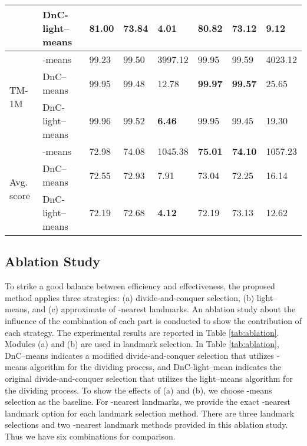 \begin{table*}[]
\begin{tabular}{@{}llllllll@{}}
                                & DnC-light--means & {81.00}        & {73.84}          & \multicolumn{1}{l|}{{\textbf{4.01}}} & {80.82}          & {73.12}          & {9.12}    \\
    \midrule
    \multirow{3}{*}{TM-1M}      & -means           & {99.23}        & {99.50}          & \multicolumn{1}{l|}{{3997.12}}       & 99.95            & 99.59            & 4023.12   \\
                                & DnC--means       & 99.95          & 99.48            & \multicolumn{1}{l|}{12.78}           & \textbf{99.97}   & \textbf{99.57}   & 25.65     \\
                                & DnC-light--means & {99.96}        & {99.52}          & \multicolumn{1}{l|}{{\textbf{6.46}}} & {99.95}          & {99.45}          & {19.30}   \\
    \midrule
    \midrule
    \multirow{3}{*}{Avg. score} & -means           & {72.98}        & {{74.08}}        & \multicolumn{1}{l|}{{1045.38}}       & {\textbf{75.01}} & {\textbf{74.10}} & {1057.23} \\
                                & DnC--means       & {72.55}        & {72.93}          & \multicolumn{1}{l|}{{7.91}}          & {73.04}          & {72.25}          & {16.14}   \\
                                & DnC-light--means & {72.19}        & {72.68}          & \multicolumn{1}{l|}{{\textbf{4.12}}} & {72.19}          & {73.13}          & {{12.62}} \\
    \bottomrule
  \end{tabular}\end{table*}

\subsection{Ablation Study}

To strike a good balance between efficiency and effectiveness, the proposed method applies three strategies: (a) divide-and-conquer selection, (b) light--means, and (c) approximate of -nearest landmarks.
An ablation study about the influence of the combination of each part is conducted to show the contribution of each strategy.
The experimental results are reported in Table \ref{tab:ablation}.
Modules (a) and (b) are used in landmark selection.
In Table \ref{tab:ablation}, DnC--means indicates a modified divide-and-conquer selection that utilizes -means algorithm for the dividing process, and DnC-light--mean indicates the original divide-and-conquer selection that utilizes the light--means algorithm for the dividing process.
To show the effects of (a) and (b), we choose -means selection as the baseline.
For -nearest landmarks, we provide the exact -nearest landmark option for each landmark selection method.
There are three landmark selections and two -nearest landmark methods provided in this ablation study.
Thus we have six combinations for comparison. 

